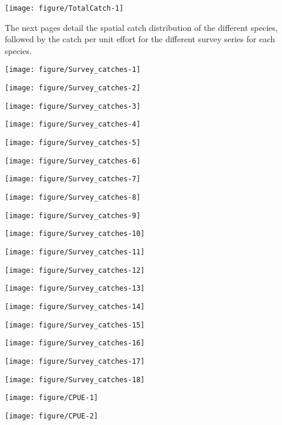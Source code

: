 \documentclass[12pt]{article}\usepackage[]{graphicx}\usepackage[]{color}
\makeatletter
\def\maxwidth{ %
  \ifdim\Gin@nat@width>\linewidth
    \linewidth
  \else
    \Gin@nat@width
  \fi
}
\newenvironment{knitrout}{}{} %
\makeatother
\begin{document}
\begin{knitrout}\footnotesize
{}\color{fgcolor}

{\centering \texttt{[image: figure/TotalCatch-1]} 

}



\end{knitrout}

The next pages detail the spatial catch distribution of the different species,
followed by the catch per unit effort for the different survey series for each
species. 

\begin{landscape}

\begin{knitrout}\footnotesize
{}\color{fgcolor}
\texttt{[image: figure/Survey\_catches-1]} 

\texttt{[image: figure/Survey\_catches-2]} 

\texttt{[image: figure/Survey\_catches-3]} 

\texttt{[image: figure/Survey\_catches-4]} 

\texttt{[image: figure/Survey\_catches-5]} 

\texttt{[image: figure/Survey\_catches-6]} 

\texttt{[image: figure/Survey\_catches-7]} 

\texttt{[image: figure/Survey\_catches-8]} 

\texttt{[image: figure/Survey\_catches-9]} 

\texttt{[image: figure/Survey\_catches-10]} 

\texttt{[image: figure/Survey\_catches-11]} 

\texttt{[image: figure/Survey\_catches-12]} 

\texttt{[image: figure/Survey\_catches-13]} 

\texttt{[image: figure/Survey\_catches-14]} 

\texttt{[image: figure/Survey\_catches-15]} 

\texttt{[image: figure/Survey\_catches-16]} 

\texttt{[image: figure/Survey\_catches-17]} 

\texttt{[image: figure/Survey\_catches-18]} 

\end{knitrout}

\begin{knitrout}\footnotesize
{}\color{fgcolor}
\texttt{[image: figure/CPUE-1]} 

\texttt{[image: figure/CPUE-2]} 

\end{knitrout}

\end{landscape}
\end{document}
